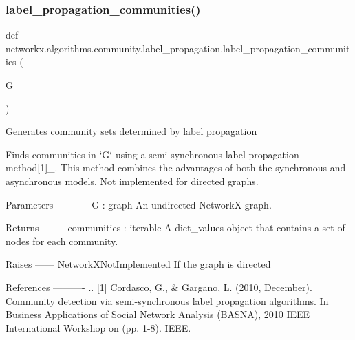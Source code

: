 \subsubsection{\texorpdfstring{label\+\_\+propagation\+\_\+communities()}{label\_propagation\_communities()}}
{\footnotesize\ttfamily def networkx.\+algorithms.\+community.\+label\+\_\+propagation.\+label\+\_\+propagation\+\_\+communities (\begin{DoxyParamCaption}\item[{}]{G }\end{DoxyParamCaption})}

\begin{DoxyVerb}Generates community sets determined by label propagation

Finds communities in `G` using a semi-synchronous label propagation
method[1]_. This method combines the advantages of both the synchronous
and asynchronous models. Not implemented for directed graphs.

Parameters
----------
G : graph
    An undirected NetworkX graph.

Returns
-------
communities : iterable
    A dict_values object that contains a set of nodes for each community.

Raises
------
NetworkXNotImplemented
   If the graph is directed

References
----------
.. [1] Cordasco, G., & Gargano, L. (2010, December). Community detection
   via semi-synchronous label propagation algorithms. In Business
   Applications of Social Network Analysis (BASNA), 2010 IEEE International
   Workshop on (pp. 1-8). IEEE.
\end{DoxyVerb}
 
